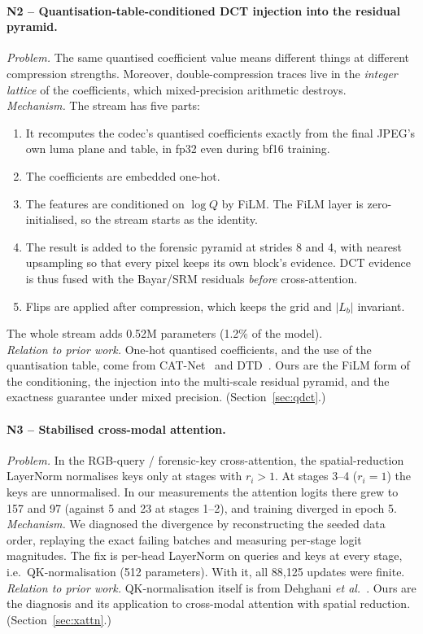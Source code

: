 \documentclass[10pt,a4paper]{article}
\begin{document}
\paragraph{N2 -- Quantisation-table-conditioned DCT injection into the residual pyramid.}
\emph{Problem.} The same quantised coefficient value means different things at different
compression strengths. Moreover, double-compression traces live in the \emph{integer
lattice} of the coefficients, which mixed-precision arithmetic destroys.\\
\emph{Mechanism.} The stream has five parts:
\begin{enumerate}[label=(\alph*)]
  \item It recomputes the codec's quantised coefficients exactly from the final JPEG's own
        luma plane and table, in fp32 even during bf16 training.
  \item The coefficients are embedded one-hot.
  \item The features are conditioned on $\log Q$ by FiLM. The FiLM layer is
        zero-initialised, so the stream starts as the identity.
  \item The result is added to the forensic pyramid at strides 8 and 4, with nearest
        upsampling so that every pixel keeps its own block's evidence. DCT evidence is thus
        fused with the Bayar/SRM residuals \emph{before} cross-attention.
  \item Flips are applied after compression, which keeps the grid and $|L_b|$ invariant.
\end{enumerate}
The whole stream adds 0.52M parameters (1.2\% of the model).\\
\emph{Relation to prior work.} One-hot quantised coefficients, and the use of the
quantisation table, come from CAT-Net~\cite{catnet} and DTD~\cite{dtd}. Ours are the FiLM
form of the conditioning, the injection into the multi-scale residual pyramid, and the
exactness guarantee under mixed precision.
(Section~\ref{sec:qdct}.)

\paragraph{N3 -- Stabilised cross-modal attention.}
\emph{Problem.} In the RGB-query / forensic-key cross-attention, the spatial-reduction
LayerNorm normalises keys only at stages with $r_i>1$. At stages 3--4 ($r_i=1$) the keys are
unnormalised. In our measurements the attention logits there grew to 157 and 97 (against
5 and 23 at stages 1--2), and training diverged in epoch 5.\\
\emph{Mechanism.} We diagnosed the divergence by reconstructing the seeded data order,
replaying the exact failing batches and measuring per-stage logit magnitudes. The fix is
per-head LayerNorm on queries and keys at every stage, i.e.\ QK-normalisation
(512 parameters). With it, all 88{,}125 updates were finite.\\
\emph{Relation to prior work.} QK-normalisation itself is from Dehghani
\emph{et al.}~\cite{qknorm}. Ours are the diagnosis and its application to cross-modal
attention with spatial reduction.
(Section~\ref{sec:xattn}.)
\end{document}
